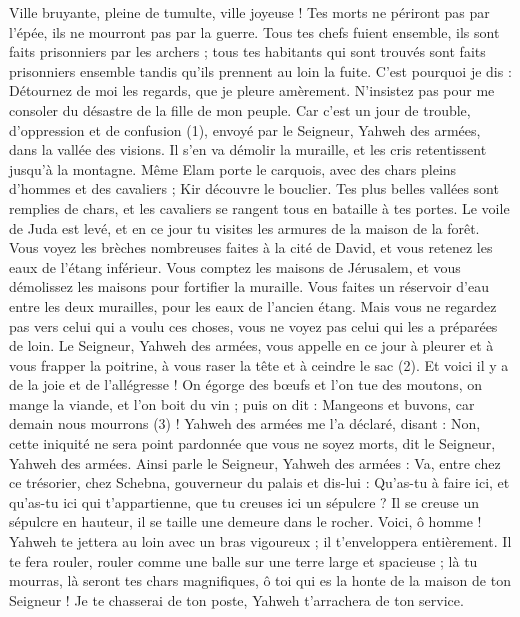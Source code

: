 \begin{multicols}{2}
{Ville bruyante, pleine de tumulte, ville joyeuse ! Tes morts ne périront pas par l'épée, ils ne mourront pas par la guerre.
Tous tes chefs fuient ensemble, ils sont faits prisonniers par les archers ; tous tes habitants qui sont trouvés sont faits prisonniers ensemble tandis qu’ils prennent au loin la fuite.
C'est pourquoi je dis : Détournez de moi les regards, que je pleure amèrement. N’insistez pas pour me consoler du désastre de la fille de mon peuple.
Car c'est un jour de trouble, d'oppression et de confusion (1), envoyé par le Seigneur, Yahweh des armées, dans la vallée des visions. Il s'en va démolir la muraille, et les cris retentissent jusqu'à la montagne.
Même Elam porte le carquois, avec des chars pleins d’hommes et des cavaliers ; Kir découvre le bouclier.
Tes plus belles vallées sont remplies de chars, et les cavaliers se rangent tous en bataille à tes portes.
Le voile de Juda est levé, et en ce jour tu visites les armures de la maison de la forêt.
Vous voyez les brèches nombreuses faites à la cité de David, et vous retenez les eaux de l’étang inférieur.
Vous comptez les maisons de Jérusalem, et vous démolissez les maisons pour fortifier la muraille.
Vous faites un réservoir d'eau entre les deux murailles, pour les eaux de l’ancien étang. Mais vous ne regardez pas vers celui qui a voulu ces choses, vous ne voyez pas celui qui les a préparées de loin.
Le Seigneur, Yahweh des armées, vous appelle en ce jour à pleurer et à vous frapper la poitrine, à vous raser la tête et à ceindre le sac (2).
Et voici il y a de la joie et de l'allégresse ! On égorge des bœufs et l’on tue des moutons, on mange la viande, et l’on boit du vin ; puis on dit : Mangeons et buvons, car demain nous mourrons (3) !
Yahweh des armées me l’a déclaré, disant : Non, cette iniquité ne sera point pardonnée que vous ne soyez morts, dit le Seigneur, Yahweh des armées.
Ainsi parle le Seigneur, Yahweh des armées : Va, entre chez ce trésorier, chez Schebna, gouverneur du palais et dis-lui :
Qu'as-tu à faire ici, et qu’as-tu ici qui t'appartienne, que tu creuses ici un sépulcre ? Il se creuse un sépulcre en hauteur, il se taille une demeure dans le rocher.
Voici, ô homme ! Yahweh te jettera au loin avec un bras vigoureux ; il t’enveloppera entièrement.
Il te fera rouler, rouler comme une balle sur une terre large et spacieuse ; là tu mourras, là seront tes chars magnifiques, ô toi qui es la honte de la maison de ton Seigneur !
Je te chasserai de ton poste, Yahweh t’arrachera de ton service.
}
\end{multicols}
